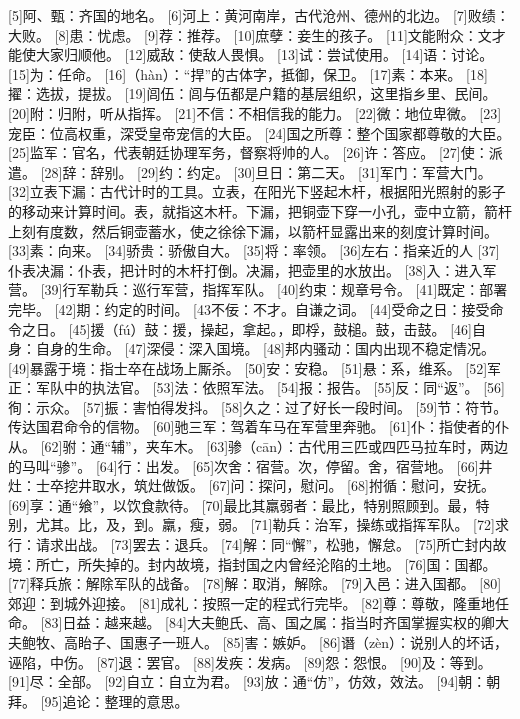 \documentclass[12pt,UTF8]{ctexbook}
\begin{document}
[5]阿、甄：齐国的地名。
[6]河上：黄河南岸，古代沧州、德州的北边。
[7]败绩：大败。
[8]患：忧虑。
[9]荐：推荐。
[10]庶孽：妾生的孩子。
[11]文能附众：文才能使大家归顺他。
[12]威敌：使敌人畏惧。
[13]试：尝试使用。
[14]语：讨论。
[15]为：任命。
[16]（hàn）：“捍”的古体字，抵御，保卫。
[17]素：本来。
[18]擢：选拔，提拔。
[19]闾伍：闾与伍都是户籍的基层组织，这里指乡里、民间。
[20]附：归附，听从指挥。
[21]不信：不相信我的能力。
[22]微：地位卑微。
[23]宠臣：位高权重，深受皇帝宠信的大臣。
[24]国之所尊：整个国家都尊敬的大臣。
[25]监军：官名，代表朝廷协理军务，督察将帅的人。
[26]许：答应。
[27]使：派遣。
[28]辞：辞别。
[29]约：约定。
[30]旦日：第二天。
[31]军门：军营大门。
[32]立表下漏：古代计时的工具。立表，在阳光下竖起木杆，根据阳光照射的影子的移动来计算时间。表，就指这木杆。下漏，把铜壶下穿一小孔，壶中立箭，箭杆上刻有度数，然后铜壶蓄水，使之徐徐下漏，以箭杆显露出来的刻度计算时间。
[33]素：向来。
[34]骄贵：骄傲自大。
[35]将：率领。
[36]左右：指亲近的人
[37]仆表决漏：仆表，把计时的木杆打倒。决漏，把壶里的水放出。
[38]入：进入军营。
[39]行军勒兵：巡行军营，指挥军队。
[40]约束：规章号令。
[41]既定：部署完毕。
[42]期：约定的时间。
[43不佞：不才。自谦之词。
[44]受命之日：接受命令之日。
[45]援（fú）鼓：援，操起，拿起。，即桴，鼓槌。鼓，击鼓。
[46]自身：自身的生命。
[47]深侵：深入国境。
[48]邦内骚动：国内出现不稳定情况。
[49]暴露于境：指士卒在战场上厮杀。
[50]安：安稳。
[51]悬：系，维系。
[52]军正：军队中的执法官。
[53]法：依照军法。
[54]报：报告。
[55]反：同“返”。
[56]徇：示众。
[57]振：害怕得发抖。
[58]久之：过了好长一段时间。
[59]节：符节。传达国君命令的信物。
[60]驰三军：驾着车马在军营里奔驰。
[61]仆：指使者的仆从。
[62]驸：通“辅”，夹车木。
[63]骖（cān）：古代用三匹或四匹马拉车时，两边的马叫“骖”。
[64]行：出发。
[65]次舍：宿营。次，停留。舍，宿营地。
[66]井灶：士卒挖井取水，筑灶做饭。
[67]问：探问，慰问。
[68]拊循：慰问，安抚。
[69]享：通“飨”，以饮食款待。
[70]最比其羸弱者：最比，特别照顾到。最，特别，尤其。比，及，到。羸，瘦，弱。
[71]勒兵：治军，操练或指挥军队。
[72]求行：请求出战。
[73]罢去：退兵。
[74]解：同“懈”，松驰，懈怠。
[75]所亡封内故境：所亡，所失掉的。封内故境，指封国之内曾经沦陷的土地。
[76]国：国都。
[77]释兵旅：解除军队的战备。
[78]解：取消，解除。
[79]入邑：进入国都。
[80]郊迎：到城外迎接。
[81]成礼：按照一定的程式行完毕。
[82]尊：尊敬，隆重地任命。
[83]日益：越来越。
[84]大夫鲍氏、高、国之属：指当时齐国掌握实权的卿大夫鲍牧、高眙子、国惠子一班人。
[85]害：嫉妒。
[86]谮（zèn）：说别人的坏话，诬陷，中伤。
[87]退：罢官。
[88]发疾：发病。
[89]怨：怨恨。
[90]及：等到。
[91]尽：全部。
[92]自立：自立为君。
[93]放：通“仿”，仿效，效法。
[94]朝：朝拜。
[95]追论：整理的意思。
\end{document}
